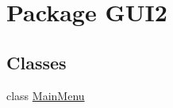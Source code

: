 \hypertarget{namespace_g_u_i2}{\section{Package G\+U\+I2}
\label{namespace_g_u_i2}
}
\subsection*{Classes}
\begin{DoxyCompactItemize}
\item 
class \hyperlink{class_g_u_i2_1_1_main_menu}{Main\+Menu}
\end{DoxyCompactItemize}
